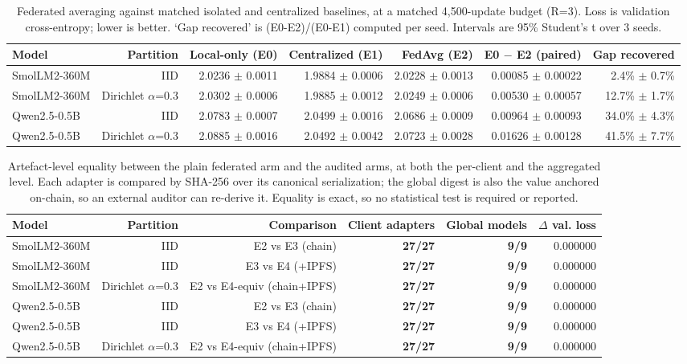 
\begin{table}[t]
\centering
\small
\caption{Federated averaging against matched isolated and centralized baselines, at a matched 4{,}500-update budget (R=3). Loss is validation cross-entropy; lower is better. `Gap recovered' is (E0-E2)/(E0-E1) computed per seed. Intervals are 95\% Student's t over 3 seeds.}
\label{tab:main}
\begin{tabular}{lrrrrrr}
\toprule
\textbf{Model} & \textbf{Partition} & \textbf{Local-only (E0)} & \textbf{Centralized (E1)} & \textbf{FedAvg (E2)} & \textbf{E0 $-$ E2 (paired)} & \textbf{Gap recovered} \\
\midrule
SmolLM2-360M & IID & 2.0236 $\pm$ 0.0011 & 1.9884 $\pm$ 0.0006 & 2.0228 $\pm$ 0.0013 & 0.00085 $\pm$ 0.00022 & 2.4\% $\pm$ 0.7\% \\
SmolLM2-360M & Dirichlet $\alpha$=0.3 & 2.0302 $\pm$ 0.0006 & 1.9885 $\pm$ 0.0012 & 2.0249 $\pm$ 0.0006 & 0.00530 $\pm$ 0.00057 & 12.7\% $\pm$ 1.7\% \\
Qwen2.5-0.5B & IID & 2.0783 $\pm$ 0.0007 & 2.0499 $\pm$ 0.0016 & 2.0686 $\pm$ 0.0009 & 0.00964 $\pm$ 0.00093 & 34.0\% $\pm$ 4.3\% \\
Qwen2.5-0.5B & Dirichlet $\alpha$=0.3 & 2.0885 $\pm$ 0.0016 & 2.0492 $\pm$ 0.0042 & 2.0723 $\pm$ 0.0028 & 0.01626 $\pm$ 0.00128 & 41.5\% $\pm$ 7.7\% \\
\bottomrule
\end{tabular}
\end{table}

\begin{table}[t]
\centering
\small
\caption{Artefact-level equality between the plain federated arm and the audited arms, at both the per-client and the aggregated level. Each adapter is compared by SHA-256 over its canonical serialization; the global digest is also the value anchored on-chain, so an external auditor can re-derive it. Equality is exact, so no statistical test is required or reported.}
\label{tab:hash}
\begin{tabular}{lrrrrr}
\toprule
\textbf{Model} & \textbf{Partition} & \textbf{Comparison} & \textbf{Client adapters} & \textbf{Global models} & \textbf{$\Delta$ val. loss} \\
\midrule
SmolLM2-360M & IID & E2 vs E3 (chain) & \textbf{27/27} & \textbf{9/9} & 0.000000 \\
SmolLM2-360M & IID & E3 vs E4 (+IPFS) & \textbf{27/27} & \textbf{9/9} & 0.000000 \\
SmolLM2-360M & Dirichlet $\alpha$=0.3 & E2 vs E4-equiv (chain+IPFS) & \textbf{27/27} & \textbf{9/9} & 0.000000 \\
Qwen2.5-0.5B & IID & E2 vs E3 (chain) & \textbf{27/27} & \textbf{9/9} & 0.000000 \\
Qwen2.5-0.5B & IID & E3 vs E4 (+IPFS) & \textbf{27/27} & \textbf{9/9} & 0.000000 \\
Qwen2.5-0.5B & Dirichlet $\alpha$=0.3 & E2 vs E4-equiv (chain+IPFS) & \textbf{27/27} & \textbf{9/9} & 0.000000 \\
\bottomrule
\end{tabular}
\end{table}

